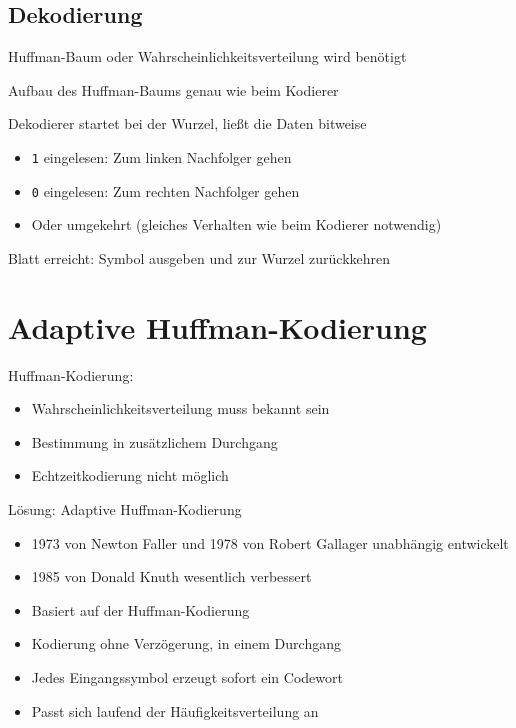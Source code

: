 \documentclass[xcolor=dvipsnames,presentation]{beamer}    %
\newenvironment{witemize}{\itemize\setlength{\itemsep}{1em}}{\enditemize}
\begin{document}
\subsection{Dekodierung}

\begin{frame}[<+->]{\insertsubsection}
  \begin{witemize}
  \item Huffman-Baum oder Wahrscheinlichkeitsverteilung wird benötigt
  \item Aufbau des Huffman-Baums genau wie beim Kodierer
  \item Dekodierer startet bei der Wurzel, ließt die Daten bitweise
    \begin{itemize}
    \item {\tt1} eingelesen: Zum linken Nachfolger gehen
    \item {\tt0} eingelesen: Zum rechten Nachfolger gehen
    \item Oder umgekehrt (gleiches Verhalten wie beim Kodierer notwendig)
    \end{itemize}
  \item Blatt erreicht: Symbol ausgeben und zur Wurzel zurückkehren
  \end{witemize}
\end{frame}

\section{Adaptive Huffman-Kodierung}

\begin{frame}[<+->]{\insertsection}
  \begin{witemize}
  \item Huffman-Kodierung:
    \begin{itemize}
      \item Wahrscheinlichkeitsverteilung muss
        bekannt sein
      \item Bestimmung in zusätzlichem Durchgang
      \item Echtzeitkodierung nicht möglich
    \end{itemize}
  \item Lösung: Adaptive Huffman-Kodierung
    \begin{itemize}
    \item 1973 von Newton Faller und 1978 von Robert Gallager
      unabhängig entwickelt
    \item 1985 von Donald Knuth wesentlich verbessert
    \item Basiert auf der Huffman-Kodierung
    \item Kodierung ohne Verzögerung, in einem Durchgang
    \item Jedes Eingangssymbol erzeugt sofort ein Codewort
    \item Passt sich laufend der Häufigkeitsverteilung an
    \end{itemize}
  \end{witemize}
\end{frame}
\end{document}
